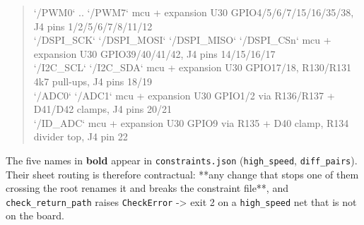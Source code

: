 \documentclass[11pt,a4paper]{article}
\begin{document}
\begin{quote}
\textbar{} `/PWM0` .. `/PWM7` \textbar{} mcu + expansion \textbar{} U30 GPIO4/5/6/7/15/16/35/38, J4 pins 1/2/5/6/7/8/11/12 \textbar{}\\
\textbar{} `/DSPI\_SCK` `/DSPI\_MOSI` `/DSPI\_MISO` `/DSPI\_CSn` \textbar{} mcu + expansion \textbar{} U30 GPIO39/40/41/42, J4 pins 14/15/16/17 \textbar{}\\
\textbar{} `/I2C\_SCL` `/I2C\_SDA` \textbar{} mcu + expansion \textbar{} U30 GPIO17/18, R130/R131 4k7 pull-ups, J4 pins 18/19 \textbar{}\\
\textbar{} `/ADC0` `/ADC1` \textbar{} mcu + expansion \textbar{} U30 GPIO1/2 via R136/R137 + D41/D42 clamps, J4 pins 20/21 \textbar{}\\
\textbar{} `/ID\_ADC` \textbar{} mcu + expansion \textbar{} U30 GPIO9 via R135 + D40 clamp, R134 divider top, J4 pin 22 \textbar{}
\end{quote}
The five names in \textbf{bold} appear in \texttt{constraints.json} (\texttt{high\_speed}, \texttt{diff\_pairs}). Their sheet routing is therefore contractual: {*}{*}any change that stops one of them crossing the root renames it and breaks the constraint file{*}{*}, and \texttt{check\_return\_path} raises \texttt{CheckError} -\textgreater{} exit 2 on a \texttt{high\_speed} net that is not on the board.
\end{document}
